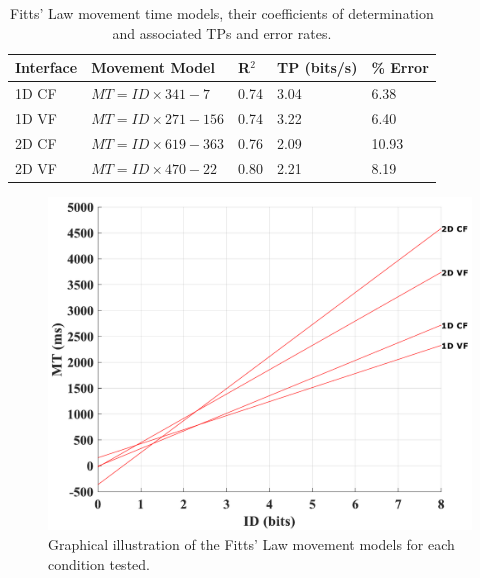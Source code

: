 \documentclass [12pt,letterpaper]{report}
\begin{document}
\begin{table}[pb]
\centering
\caption{Fitts' Law movement time models, their coefficients of determination and associated TPs and error rates.}
\label{fitts_TP_table}
\begin{tabular}{@{}l|ll|ll@{}}
\toprule
\textbf{Interface} & \textbf{Movement Model} & \textbf{R$^2$} & \textbf{TP (bits/s)} & \textbf{\% Error} \\ \midrule
1D CF              & $MT=I\!D\times341-7$         & 0.74                         & 3.04                 & 6.38              \\
1D VF              & $MT=I\!D\times271-156$       & 0.74                         & 3.22                 & 6.40               \\
2D CF              & $MT=I\!D\times619-363$       & 0.76                         & 2.09                 & 10.93             \\
2D VF              & $MT=I\!D\times470-22$        & 0.80                         & 2.21                 & 8.19              \\ \bottomrule
\end{tabular}
\end{table}

\begin{figure}[htpb]
  \centering
  \includegraphics[scale=0.45]{fig/fitts_models}
  \caption{Graphical illustration of the Fitts' Law movement models for each condition tested.%
  }
  \label{fitts_models}
\end{figure}
\end{document}
